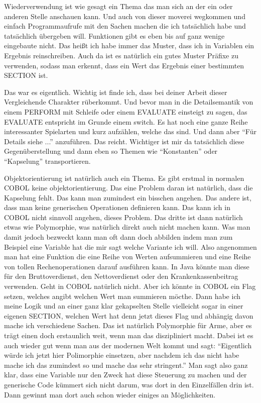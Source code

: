 {Wiederverwendung ist wie gesagt ein Thema das man sich an der ein oder anderen Stelle anschauen kann. Und auch von dieser moverei wegkommen und einfach Programmaufrufe mit den Sachen machen die ich tatsächlich habe und tatsächlich übergeben will. Funktionen gibt es eben bis auf ganz wenige eingebaute nicht. Das heißt ich habe immer das Muster, dass ich in Variablen ein Ergebnis reinschreiben. Auch da ist es natürlich ein gutes Muster Präfixe zu verwenden, sodass man erkennt, dass ein Wert das Ergebnis einer bestimmten SECTION ist.

Das war es eigentlich. Wichtig ist finde ich, dass bei deiner Arbeit dieser Vergleichende Charakter rüberkommt. Und bevor man in die Detailsemantik von einem PERFORM mit Schleife oder einem EVALUATE einsteigt zu sagen, das EVALUATE entspricht im Grunde einem switch. Es hat noch eine ganze Reihe interessanter Spielarten und kurz aufzählen, welche das sind. Und dann aber ``Für Details siehe ...'' anzuführen. Das reicht. Wichtiger ist mir da tatsächlich diese Gegenüberstellung und dann eben so Themen wie ``Konstanten'' oder ``Kapselung'' transportieren.

Objektorientierung ist natürlich auch ein Thema. Es gibt erstmal in normalen COBOL keine objektorientierung. Das eine Problem daran ist natürlich, dass die Kapselung fehlt. Das kann man zumindest ein bisschen angehen. Das andere ist, dass man keine generischen Operationen definieren kann. Das kann ich in COBOL nicht sinnvoll angehen, dieses Problem. Das dritte ist dann natürlich etwas wie Polymorphie, was natürlich direkt auch nicht machen kann. Was man damit jedoch bezweckt kann man oft dann doch abbilden indem man zum Beispiel eine Variable hat die mir sagt welche Variante ich will. Also angenommen man hat eine Funktion die eine Reihe von Werten aufsummieren und eine Reihe von tollen Rechenoperationen darauf ausführen kann. In Java könnte man diese für den Bruttoverdienst, den Nettoverdienst oder den Krankenkassenbeitrag verwenden. Geht in COBOL natürlich nicht. Aber ich könnte in COBOL ein Flag setzen, welches angibt welchen Wert man summieren möcthe. Dann habe ich meine Logik und an einer ganz klar gekapselten Stelle vielleicht sogar in einer eigenen SECTION, welchen Wert hat denn jetzt dieses Flag und abhängig davon mache ich verschiedene Sachen. Das ist natürlich Polymorphie für Arme, aber es trägt einen doch erstaunlich weit, wenn man das diszipliniert macht. Dabei ist es auch wieder gut wenn man aus der modernen Welt kommt und sagt: ``Eigentlich würde ich jetzt hier Polimorphie einsetzen, aber nachdem ich das nicht habe mache ich das zumindest so und mache das sehr stringent.'' Man sagt also ganz klar, dass eine Variable nur den Zweck hat diese Steuerung zu machen und der generische Code kümmert sich nicht darum, was dort in den Einzelfällen drin ist. Dann gewinnt man dort auch schon wieder einiges an Möglichkeiten.

}

